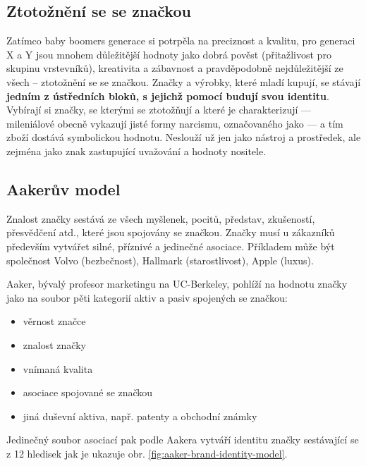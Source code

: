 \subsection{Ztotožnění se se značkou}

Zatímco baby boomers generace si potrpěla na preciznost a kvalitu, pro generaci X a Y jsou mnohem důležitější hodnoty jako dobrá pověst (přitažlivost pro skupinu vrstevníků), kreativita a zábavnost a pravděpodobně nejdůležitější ze všech -- ztotožnění se se značkou. Značky a výrobky, které mladí kupují, se stávají \textbf{jedním z ústředních bloků, s jejichž pomocí budují svou identitu}. Vybírají si značky, se kterými se ztotožňují a které je charakterizují --- mileniálové obecně vykazují jisté formy narcismu, označovaného jako  --- a tím zboží dostává symbolickou hodnotu. Neslouží už jen jako nástroj a prostředek, ale zejména jako znak zastupující uvažování a hodnoty nositele.\cite{bergh2012coolznacky}

\subsection{Aakerův model}
Znalost značky sestává ze všech myšlenek, pocitů, představ, zkušeností, přesvědčení atd., které jsou spojovány se značkou. Značky musí u zákazníků především vytvářet silné, příznivé a jedinečné asociace.\cite[s. 315]{kotler2007marketingmanagement}
Příkladem může být společnost Volvo (bezbečnost), Hallmark (starostlivost), Apple (luxus).

Aaker, bývalý profesor marketingu na UC-Berkeley, pohlíží na hodnotu značky jako na soubor pěti kategorií aktiv a pasiv spojených se značkou\cite{kotler2007marketingmanagement}:
\begin{itemize}
    \item věrnost značce
    \item znalost značky
    \item vnímaná kvalita
    \item asociace spojované se značkou
    \item jiná duševní aktiva, např. patenty a obchodní známky
\end{itemize}

Jedinečný soubor asociací pak podle Aakera vytváří identitu značky sestávající se z 12 hledisek jak je ukazuje obr. \ref{fig:aaker-brand-identity-model}.

